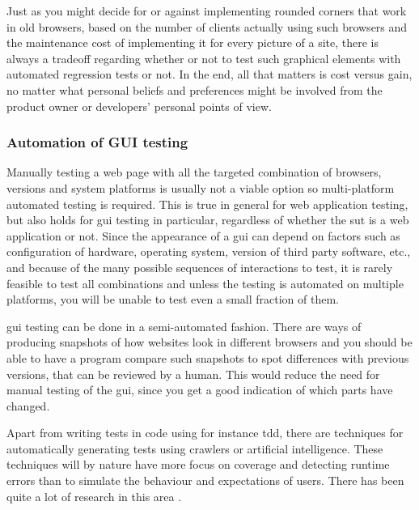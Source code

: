 \documentclass[11pt]{article}
\begin{document}
Just as you might decide for or against implementing rounded corners that work in old browsers, based on the number of clients actually using such browsers and the maintenance cost of implementing it for every picture of a site, there is always a tradeoff regarding whether or not to test such graphical elements with automated regression tests or not. In the end, all that matters is cost versus gain, no matter what personal beliefs and preferences might be involved from the product owner or developers' personal points of view. \cite[questions~40-44]{Ahnve}

\subsubsection{Automation of GUI testing}

Manually testing a web page with all the targeted combination of browsers, versions and system platforms is usually not a viable option \cite{TestSwarm} so multi-platform automated testing is required. This is true in general for web application testing, but also holds for \gls{gui} testing in particular, regardless of whether the \gls{sut} is a web application or not. Since the appearance of a \gls{gui} can depend on factors such as configuration of hardware, operating system, version of third party software, etc., and because of the many possible sequences of interactions to test, it is rarely feasible to test all combinations and unless the testing is automated on multiple platforms, you will be unable to test even a small fraction of them.

\gls{gui} testing can be done in a semi-automated fashion. There are ways of producing snapshots of how websites look in different browsers and you should be able to have a program compare such snapshots to spot differences with previous versions, that can be reviewed by a human. This would reduce the need for manual testing of the \gls{gui}, since you get a good indication of which parts have changed. %

Apart from writing tests in code using for instance \gls{tdd}, there are techniques for automatically generating tests using crawlers or artificial intelligence. These techniques will by nature have more focus on coverage and detecting runtime errors than to simulate the behaviour and expectations of users. There has been quite a lot of research in this area \cite{AutomatedTesting}\cite{AutomatedAcceptance}\cite{AutomatedAjax}.
\end{document}
